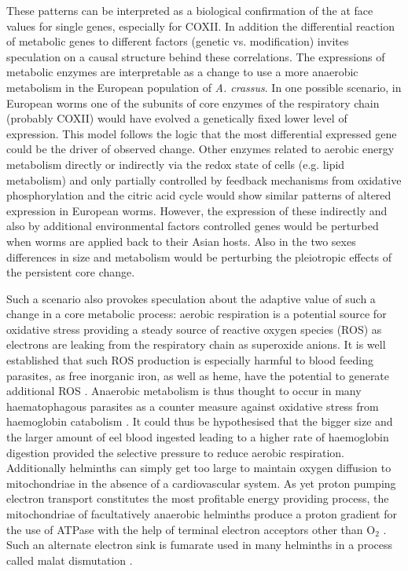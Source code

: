 These patterns can be interpreted as a biological confirmation of the
at face values for single genes, especially for COXII. In addition the
differential reaction of metabolic genes to different factors (genetic
vs. modification) invites speculation on a causal structure behind
these correlations. The expressions of metabolic enzymes are
interpretable as a change to use a more anaerobic metabolism in the
European population of \textit{A. crassus}. In one possible scenario,
in European worms one of the subunits of core enzymes of the
respiratory chain (probably COXII) would have evolved a genetically
fixed lower level of expression. This model follows the logic that the
most differential expressed gene could be the driver of observed
change. Other enzymes related to aerobic energy metabolism directly or
indirectly via the redox state of cells (e.g. lipid metabolism) and
only partially controlled by feedback mechanisms from oxidative
phosphorylation and the citric acid cycle would show similar patterns
of altered expression in European worms. However, the expression of
these indirectly and also by additional environmental factors
controlled genes would be perturbed when worms are applied back to
their Asian hosts. Also in the two sexes differences in size and
metabolism would be perturbing the pleiotropic effects of the
persistent core change.

Such a scenario also provokes speculation about the adaptive value of
such a change in a core metabolic process: aerobic respiration is a
potential source for oxidative stress providing a steady source of
reactive oxygen species (ROS) as electrons are leaking from the
respiratory chain as superoxide anions. It is well established that
such ROS production is especially harmful to blood feeding parasites,
as free inorganic iron, as well as heme, have the potential to
generate additional ROS \cite{pmid21087517}. Anaerobic metabolism is
thus thought to occur in many haematophagous parasites as a counter
measure against oxidative stress from haemoglobin catabolism
\cite{pmid12163151}. It could thus be hypothesised that the bigger
size and the larger amount of eel blood ingested leading to a higher
rate of haemoglobin digestion provided the selective pressure to
reduce aerobic respiration. Additionally helminths can simply get too
large to maintain oxygen diffusion to mitochondriae in the absence of
a cardiovascular system. As yet proton pumping electron transport
constitutes the most profitable energy providing process, the
mitochondriae of facultatively anaerobic helminths produce a proton
gradient for the use of ATPase with the help of terminal electron
acceptors other than O$_2$ \cite{pmid12417132}. Such an alternate
electron sink is fumarate used in many helminths in a process called
malat dismutation \cite{pmid15275412}.

